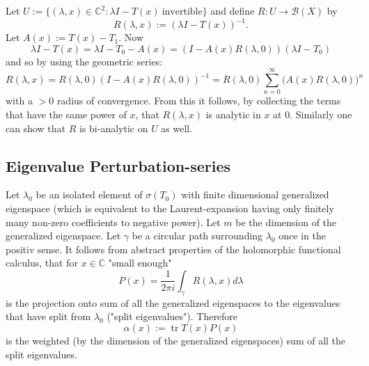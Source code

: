 \documentclass[11pt, a4paper]{article} %
\numberwithin{equation}{subsection} %
\theoremstyle{definition} %
\theoremstyle{plain} %
\DeclareMathOperator{\tr}{tr}
\begin{document}
Let $U:= \{ (\lambda, x) \in \mathbb{C}^2 : \lambda I - T(x) \ \text{invertible} \}$
and define
$R: U \to \mathscr{B}(X)$ by
\begin{equation}
	R(\lambda, x) := (\lambda I - T(x))^{-1}.
\end{equation}
Let $A(x):= T(x)-T_1$.
Now
\begin{equation}
	\lambda I - T (x) = \lambda I - T_0 - A(x) = ( I - A(x) R(\lambda,0)) (\lambda I -T_0)
\end{equation}
and so by using the geometric series:
\begin{equation}
	\label{eq:eq_R_expansion}
	R(\lambda,x) = R(\lambda,0)  ( I - A(x) R(\lambda,0))^{-1} =
	R(\lambda,0)  \sum_{n=0}^\infty  (A(x) R(\lambda,0) \big)^n
\end{equation}
with a $>0$ radius of convergence.
From this it follows, by collecting the terms that have the same power of $x$,
that $R(\lambda,x)$ is analytic in $x$ at $0$.
Similarly one can show that $R$ is bi-analytic on $U$ as well.
\subsection{Eigenvalue Perturbation-series}
Let $\lambda_0$ be an isolated element of $\sigma (T_0)$ with finite dimensional
generalized eigenspace (which is equivalent to the Laurent-expansion having only finitely many non-zero coefficients to negative power).
Let $m$ be the dimension of the generalized eigenspace.
Let $ \gamma$ be a circular path surrounding $\lambda_0$ once in the positiv sense.
It follows from abstract properties of the holomorphic functional calculus,
that for $x \in \mathbb{C}$ "small enough"
\begin{equation}
	P(x) = \frac{1}{2\pi i} \int_\gamma  R(\lambda,x) d \lambda
\end{equation}
is the projection onto sum of all the generalized eigenspaces to the eigenvalues
that have split from $\lambda_0$ ("split eigenvalues").
Therefore
\begin{equation}
	\alpha (x) := \tr T(x) P(x)
\end{equation}
is the weighted (by the dimension of the generalized eigenspaces) sum of all
the split eigenvalues.
\end{document}
